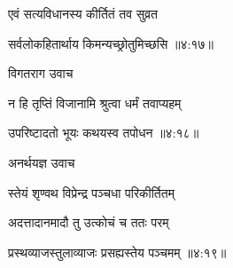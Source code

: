 {\devanagarifont एवं सत्यविधानस्य कीर्तितं तव सुव्रत \thinspace{\dandab} \dontdisplaylinenum }%


{\devanagarifont सर्वलोकहितार्थाय किमन्यच्छ्रोतुमिच्छसि {॥४:१७॥} \veg\dontdisplaylinenum }%
 

 
{\devanagarifont विगतराग उवाच {\dandab}\dontdisplaylinenum  }%
 
{\devanagarifont न हि तृप्तिं विजानामि श्रुत्वा धर्मं तवाप्यहम् \thinspace{\danda} \dontdisplaylinenum }%


{\devanagarifont उपरिष्टादतो भूयः कथयस्व तपोधन {॥४:१८॥} \veg\dontdisplaylinenum }%

{\devanagarifont अनर्थयज्ञ उवाच {\dandab}\dontdisplaylinenum  }%
 
{\devanagarifont स्तेयं शृण्वथ विप्रेन्द्र पञ्चधा परिकीर्तितम् \thinspace{\danda} \dontdisplaylinenum }%

{\devanagarifont अदत्तादानमादौ तु उत्कोचं च ततः परम्  \danda\dontdisplaylinenum }%


{\devanagarifont प्रस्थव्याजस्तुलाव्याजः प्रसह्यस्तेय पञ्चमम् {॥४:१९॥} \veg\dontdisplaylinenum }%

